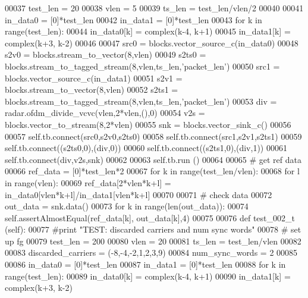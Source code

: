 \begin{DoxyCode}
00037         test\_len = 20
00038         vlen = 5
00039         ts\_len = test\_len/vlen/2
00040         
00041         in\_data0 = [0]*test\_len
00042         in\_data1 = [0]*test\_len
00043         \textcolor{keywordflow}{for} k \textcolor{keywordflow}{in} range(test\_len):
00044             in\_data0[k] = complex(k-4, k+1)
00045             in\_data1[k] = complex(k+3, k-2)
00046             
00047         src0 = blocks.vector\_source\_c(in\_data0)
00048         s2v0 = blocks.stream\_to\_vector(8,vlen)
00049         s2ts0 = blocks.stream\_to\_tagged\_stream(8,vlen,ts\_len,\textcolor{stringliteral}{'packet\_len'})
00050         src1 = blocks.vector\_source\_c(in\_data1)
00051         s2v1 = blocks.stream\_to\_vector(8,vlen)
00052         s2ts1 = blocks.stream\_to\_tagged\_stream(8,vlen,ts\_len,\textcolor{stringliteral}{'packet\_len'})
00053         div = radar.ofdm\_divide\_vcvc(vlen,2*vlen,(),0)
00054         v2s = blocks.vector\_to\_stream(8,2*vlen)
00055         snk = blocks.vector\_sink\_c()
00056         
00057         self.tb.connect(src0,s2v0,s2ts0)
00058         self.tb.connect(src1,s2v1,s2ts1)
00059         self.tb.connect((s2ts0,0),(div,0))
00060         self.tb.connect((s2ts1,0),(div,1))
00061         self.tb.connect(div,v2s,snk)
00062         
00063         self.tb.run ()
00064         
00065         \textcolor{comment}{# get ref data}
00066         ref\_data = [0]*test\_len*2
00067         \textcolor{keywordflow}{for} k \textcolor{keywordflow}{in} range(test\_len/vlen):
00068             \textcolor{keywordflow}{for} l \textcolor{keywordflow}{in} range(vlen):
00069                 ref\_data[2*vlen*k+l] = in\_data0[vlen*k+l]/in\_data1[vlen*k+l]
00070         
00071         \textcolor{comment}{# check data}
00072         out\_data =  snk.data()
00073         \textcolor{keywordflow}{for} k \textcolor{keywordflow}{in} range(len(out\_data)):
00074             self.assertAlmostEqual(ref\_data[k], out\_data[k],4)
00075             
00076     \textcolor{keyword}{def }test_002_t (self):
00077         \textcolor{comment}{#print "TEST: discarded carriers and num sync words"}
00078         \textcolor{comment}{# set up fg}
00079         test\_len = 200
00080         vlen = 20
00081         ts\_len = test\_len/vlen
00082         
00083         discarded\_carriers = (-8,-4,-2,1,2,3,9)
00084         num\_sync\_words = 2
00085         
00086         in\_data0 = [0]*test\_len
00087         in\_data1 = [0]*test\_len
00088         \textcolor{keywordflow}{for} k \textcolor{keywordflow}{in} range(test\_len):
00089             in\_data0[k] = complex(k-4, k+1)
00090             in\_data1[k] = complex(k+3, k-2)

\end{DoxyCode}
